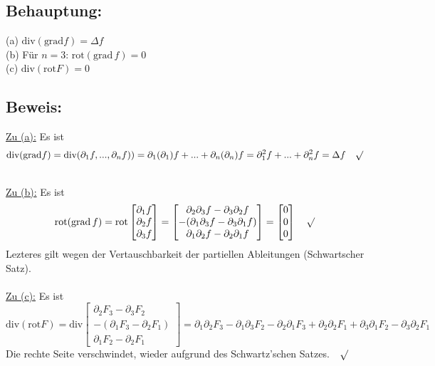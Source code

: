 \documentclass[a4paper, 12pt]{article} %
\begin{document}
\begin{flushleft}
    \subsection*{Behauptung:}
    (a) $\text{div} (\text{grad} f) = \Delta f$\\
    (b) Für $n=3$: $\text{rot} ( \text{grad} \, f) = 0$\\
    (c) $\text{div}(\text{rot}F) = 0$

    \subsection*{Beweis:}
    \underline{Zu (a):} Es ist
    $$
        \text{div} (\text{grad} f)
        = \text{div} (\partial_1 f,..., \partial_n f) )
        = \partial_1(\partial_1)f + ... + \partial_n(\partial_n)f
        = \partial^2_1 f + ... + \partial^2_n f = \Delta f  \quad \surd
    $$

    \hfill\\

    \underline{Zu (b):} Es ist
    $$
        \text{rot} ( \text{grad} \, f)
        = \text{rot} \begin{bmatrix}
            \partial_1 f \\
            \partial_2 f \\
            \partial_3 f
        \end{bmatrix}
        = \begin{bmatrix}
            \partial_2 \partial_3 f - \partial_3 \partial_2 f       \\
            - ( \partial_1 \partial_3 f - \partial_3 \partial_1 f ) \\
            \partial_1 \partial_2 f - \partial_2 \partial_1 f
        \end{bmatrix}
        = \begin{bmatrix}
            0 \\
            0 \\
            0
        \end{bmatrix}  \quad \surd
    $$
    Lezteres gilt wegen der Vertauschbarkeit der partiellen Ableitungen
    (Schwartscher Satz).\\

    \hfill\\

    \underline{Zu (c):} Es ist
    $$
        \text{div}(\text{rot}F)
        = \text{div} \begin{bmatrix}
            \partial_2 F_3 - \partial_3 F_2    \\
            -(\partial_1 F_3 - \partial_2 F_1) \\
            \partial_1 F_2 - \partial_2 F_1
        \end{bmatrix}
        = \partial_1 \partial_2 F_3 - \partial_1 \partial_3 F_2
        - \partial_2 \partial_1 F_3 + \partial_2 \partial_2 F_1
        + \partial_3 \partial_1 F_2 - \partial_3 \partial_2 F_1
    $$
    Die rechte Seite verschwindet, wieder aufgrund des Schwartz'schen Satzes.$\quad \surd$


\end{flushleft}
\end{document}
